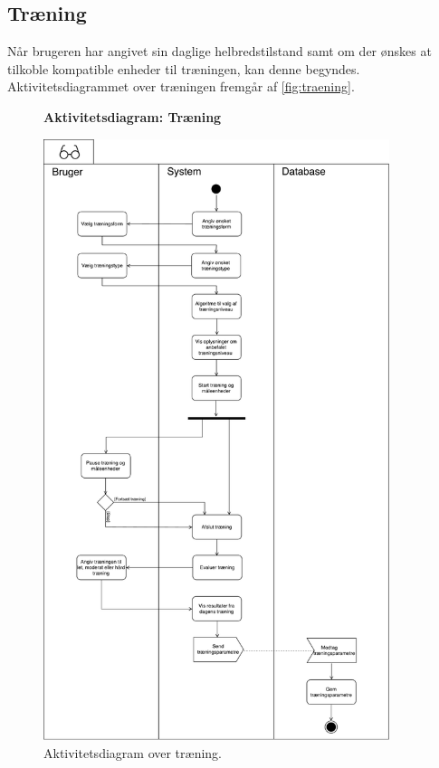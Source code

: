 \subsection*{Træning} \label{sec:traening}
Når brugeren har angivet sin daglige helbredstilstand samt om der ønskes at tilkoble kompatible enheder til træningen, kan denne begyndes. Aktivitetsdiagrammet over træningen fremgår af \autoref{fig:traening}. 

\begin{figure} [H]
\centering
\textbf{Aktivitetsdiagram: Træning}\par\medskip
\includegraphics[width=0.9\textwidth]{figures/aktivitetsdiagram/NYTraening}
\caption{Aktivitetsdiagram over træning.}
\label{fig:traening}
\end{figure}

